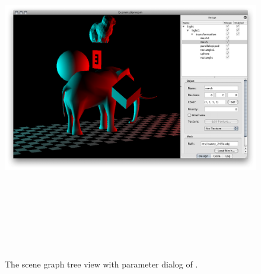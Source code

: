 \begin{figure}
\begin{center}
\includegraphics[height=15cm]{screenshots/ex_tree_screenshot.png}
\caption{The scene graph tree view with parameter dialog of \ER.\label{ssTree}}
\end{center}
\end{figure}

